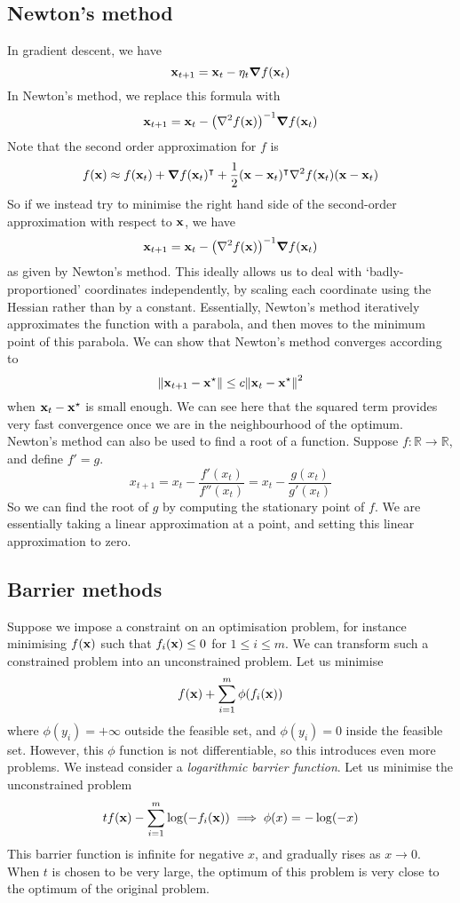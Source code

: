 \subsection{Newton's method}
In gradient descent, we have
\[
	\vb x_{t+1} = \vb x_t - \eta_t \grad{f(\vb x_t)}
\]
In Newton's method, we replace this formula with
\[
	\vb x_{t+1} = \vb x_t - \qty(\laplacian{f(\vb x)})^{-1} \grad{f(\vb x_t)}
\]
Note that the second order approximation for \(f\) is
\[
	f(\vb x) \approx f(\vb x_t) + \grad{f(\vb x_t)}^\transpose + \frac{1}{2}(\vb x - \vb x_t)^\transpose \laplacian{f(\vb x_t)}(\vb x - \vb x_t)
\]
So if we instead try to minimise the right hand side of the second-order approximation with respect to \(\vb x\), we have
\[
	\vb x_{t+1} = \vb x_t - \qty(\laplacian{f(\vb x)})^{-1} \grad{f(\vb x_t)}
\]
as given by Newton's method.
This ideally allows us to deal with `badly-proportioned' coordinates independently, by scaling each coordinate using the Hessian rather than by a constant.
Essentially, Newton's method iteratively approximates the function with a parabola, and then moves to the minimum point of this parabola.
We can show that Newton's method converges according to
\[
	\norm{\vb x_{t+1} - \vb x^\star} \leq c \norm{\vb x_{t} - \vb x^\star}^2
\]
when \(\vb x_t - \vb x^\star\) is small enough.
We can see here that the squared term provides very fast convergence once we are in the neighbourhood of the optimum.
Newton's method can also be used to find a root of a function.
Suppose \(f \colon \mathbb R \to \mathbb R\), and define \(f' = g\).
\[
	x_{t+1} = x_t - \frac{f'(x_t)}{f''(x_t)} = x_t - \frac{g(x_t)}{g'(x_t)}
\]
So we can find the root of \(g\) by computing the stationary point of \(f\).
We are essentially taking a linear approximation at a point, and setting this linear approximation to zero.

\subsection{Barrier methods}
Suppose we impose a constraint on an optimisation problem, for instance minimising \(f(\vb x)\) such that \(f_i(\vb x) \leq 0\) for \(1 \leq i \leq m\).
We can transform such a constrained problem into an unconstrained problem.
Let us minimise
\[
	f(\vb x) + \sum_{i=1}^m \phi(f_i(\vb x))
\]
where \(\phi(y_i) = +\infty\) outside the feasible set, and \(\phi(y_i) = 0\) inside the feasible set.
However, this \(\phi\) function is not differentiable, so this introduces even more problems.
We instead consider a \textit{logarithmic barrier function}.
Let us minimise the unconstrained problem
\[
	tf(\vb x) - \sum_{i=1}^m \log(-f_i(\vb x)) \implies \phi(x) = -\log (-x)
\]
This barrier function is infinite for negative \(x\), and gradually rises as \(x \to 0\).
When \(t\) is chosen to be very large, the optimum of this problem is very close to the optimum of the original problem.

